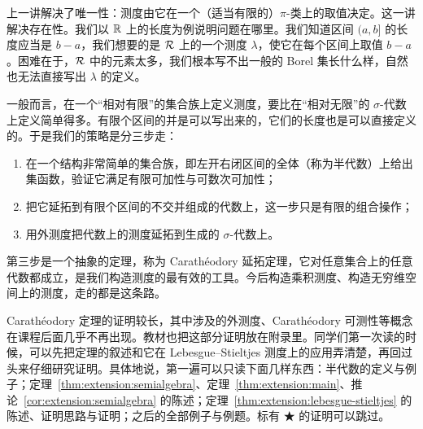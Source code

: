 \label{lec:extension-of-measures}

上一讲解决了唯一性：测度由它在一个（适当有限的）$\pi$-类上的取值决定。这一讲解决存在性。我们以 $\mathbb{R}$ 上的长度为例说明问题在哪里。我们知道区间 $(a,b]$ 的长度应当是 $b-a$，我们想要的是 $\mathcal{R}$ 上的一个测度 $\lambda$，使它在每个区间上取值 $b-a$。困难在于，$\mathcal{R}$ 中的元素太多，我们根本写不出一般的 Borel 集长什么样，自然也无法直接写出 $\lambda$ 的定义。

一般而言，在一个“相对有限”的集合族上定义测度，要比在“相对无限”的 $\sigma$-代数上定义简单得多。有限个区间的并是可以写出来的，它们的长度也是可以直接定义的。于是我们的策略是分三步走：
\begin{enumerate}
\item 在一个结构非常简单的集合族，即左开右闭区间的全体（称为半代数）上给出集函数，验证它满足有限可加性与可数次可加性；
\item 把它延拓到有限个区间的不交并组成的代数上，这一步只是有限的组合操作；
\item 用外测度把代数上的测度延拓到生成的 $\sigma$-代数上。
\end{enumerate}
第三步是一个抽象的定理，称为 Carathéodory 延拓定理，它对任意集合上的任意代数都成立，是我们构造测度的最有效的工具。今后构造乘积测度、构造无穷维空间上的测度，走的都是这条路。

Carathéodory 定理的证明较长，其中涉及的外测度、Carathéodory 可测性等概念在课程后面几乎不再出现。教材也把这部分证明放在附录里。同学们第一次读的时候，可以先把定理的叙述和它在 Lebesgue--Stieltjes 测度上的应用弄清楚，再回过头来仔细研究证明。具体地说，第一遍可以只读下面几样东西：半代数的定义与例子；定理~\ref{thm:extension:semialgebra}、定理~\ref{thm:extension:main}、推论~\ref{cor:extension:semialgebra} 的陈述；定理~\ref{thm:extension:lebesgue-stieltjes} 的陈述、证明思路与证明；之后的全部例子与例题。标有 ★ 的证明可以跳过。


